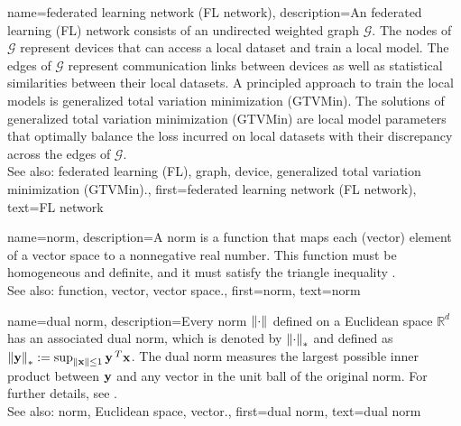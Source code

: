 {
{name={federated learning network (FL network)},
	description={An federated learning (FL) network consists of 
		an undirected weighted graph $\mathcal{G}$. The nodes of $\mathcal{G}$ represent devices 
		that can access a local dataset and train a local model. The edges of $\mathcal{G}$ represent 
		communication links between devices as well as statistical similarities between their local datasets. 
		A principled approach to train the local models is generalized total variation minimization (GTVMin). The solutions of generalized total variation minimization (GTVMin) are local 
		model parameters that optimally balance the loss incurred on local datasets with their discrepancy 
		across the edges of $\mathcal{G}$.
	    			\\ 
		See also: federated learning (FL), graph, device, generalized total variation minimization (GTVMin).},
	first={federated learning network (FL network)},
	text={FL network} 
}

{name={norm},
	description={A norm is a function that maps each (vector) element 
		of a vector space to a nonnegative real number. This function must be 
		homogeneous and definite, and it must satisfy the triangle inequality \cite{HornMatAnalysis}.
		\\
		See also: function, vector, vector space.},
	first={norm},
	text={norm} 
}

{name={dual norm},
	description={Every norm $\mleft\lVert \cdot \mright\rVert_{}$ defined on a Euclidean space $\mathbb{R}^{d}$ 
		has an associated dual norm, which is denoted by $\mleft\lVert \cdot \mright\rVert_{*}$ and defined as 
		$\mleft\lVert {\bf y} \mright\rVert_{*} := \sup_{\Vert  {{\bf x}} \Vert{} \le 1} {\bf y}\,^{T} {\bf x}$. 
		The dual norm measures the largest possible inner product between ${\bf y}$ 
		and any vector in the unit ball of the original norm. For further details, see 
		\cite[Sec.~A.1.6]{BoydConvexBook}.
					\\ 
		See also: norm, Euclidean space, vector.},
	first={dual norm},
	text={dual norm}
}

}
